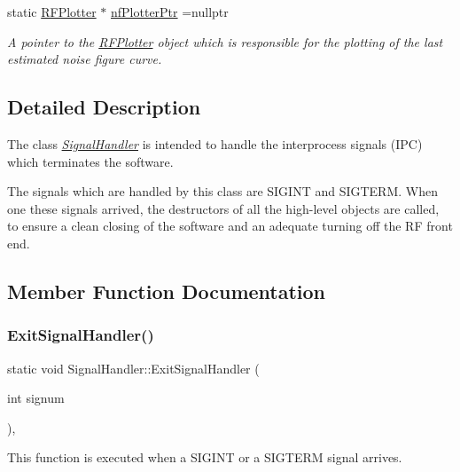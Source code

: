 \begin{DoxyCompactItemize}
static \hyperlink{classRFPlotter}{R\+F\+Plotter} $\ast$ \hyperlink{classSignalHandler_ad5f57e0f7a4ca52357bdd00c358d3a3a}{nf\+Plotter\+Ptr} =nullptr
\begin{DoxyCompactList}\small\item\em A pointer to the {\itshape \hyperlink{classRFPlotter}{R\+F\+Plotter}} object which is responsible for the plotting of the last estimated noise figure curve. \end{DoxyCompactList}\end{DoxyCompactItemize}


\subsection{Detailed Description}
The class {\itshape \hyperlink{classSignalHandler}{Signal\+Handler}} is intended to handle the interprocess signals (I\+PC) which terminates the software. 

The signals which are handled by this class are S\+I\+G\+I\+NT and S\+I\+G\+T\+E\+RM. When one these signals arrived, the destructors of all the high-\/level objects are called, to ensure a clean closing of the software and an adequate turning off the RF front end. 

\subsection{Member Function Documentation}
\mbox{\label{classSignalHandler_af32b7213b43fd13fa12587a0c0d9b565}} 
\subsubsection{\texorpdfstring{Exit\+Signal\+Handler()}{ExitSignalHandler()}}
{\footnotesize\ttfamily static void Signal\+Handler\+::\+Exit\+Signal\+Handler (\begin{DoxyParamCaption}\item[{int}]{signum }\end{DoxyParamCaption})\hspace{0.3cm}{\ttfamily [inline]}, {\ttfamily [static]}}



This function is executed when a S\+I\+G\+I\+NT or a S\+I\+G\+T\+E\+RM signal arrives. 

